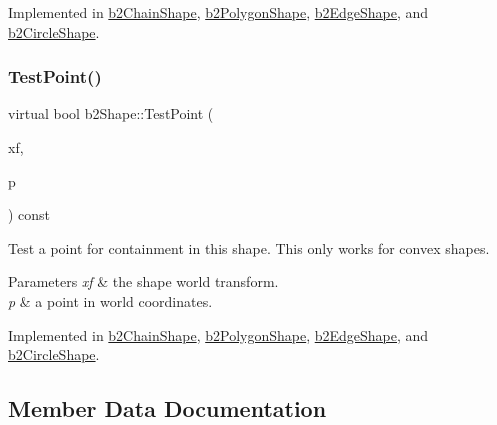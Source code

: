 Implemented in \mbox{\hyperlink{classb2_chain_shape_add9e88f7f90b32ae75738cfb042ef532}{b2\+Chain\+Shape}}, \mbox{\hyperlink{classb2_polygon_shape_a41f20072763688f1745f12f67f40e904}{b2\+Polygon\+Shape}}, \mbox{\hyperlink{classb2_edge_shape_a192cf10bd556a5a90b29a2bcee2ddd75}{b2\+Edge\+Shape}}, and \mbox{\hyperlink{classb2_circle_shape_a442e847b9fc3d1344b02b48d490eb0c6}{b2\+Circle\+Shape}}.

\mbox{\label{classb2_shape_a6ac968e403e2d93e8ae46d728a2e50fa}} 
\subsubsection{\texorpdfstring{TestPoint()}{TestPoint()}}
{\footnotesize\ttfamily virtual bool b2\+Shape\+::\+Test\+Point (\begin{DoxyParamCaption}\item[{const \mbox{\hyperlink{structb2_transform}{b2\+Transform}} \&}]{xf,  }\item[{const \mbox{\hyperlink{structb2_vec2}{b2\+Vec2}} \&}]{p }\end{DoxyParamCaption}) const\hspace{0.3cm}{\ttfamily [pure virtual]}}

Test a point for containment in this shape. This only works for convex shapes. 
\begin{DoxyParams}{Parameters}
{\em xf} & the shape world transform. \\
\hline
{\em p} & a point in world coordinates. \\
\hline
\end{DoxyParams}


Implemented in \mbox{\hyperlink{classb2_chain_shape_afd03c8679f18f9962a6c76bde629c62a}{b2\+Chain\+Shape}}, \mbox{\hyperlink{classb2_polygon_shape_a129c4ac76727fe02724f675e3fef7fe5}{b2\+Polygon\+Shape}}, \mbox{\hyperlink{classb2_edge_shape_a15151673cf9ad585779c70363425f470}{b2\+Edge\+Shape}}, and \mbox{\hyperlink{classb2_circle_shape_a84e22b3807e84b72f2981010fc197099}{b2\+Circle\+Shape}}.



\subsection{Member Data Documentation}
\mbox{\label{classb2_shape_a5de7a9bd3f9e72ef7025a65c304aaf1a}} 
